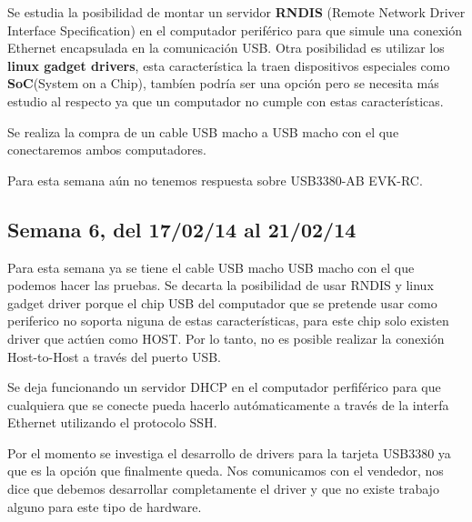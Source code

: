 \documentclass[11pt,oneside,titlepage]{article}
\begin{document}
Se estudia la posibilidad de montar un servidor \textbf{RNDIS} (Remote Network Driver Interface Specification) en el computador periférico para que simule una conexión Ethernet encapsulada en la comunicación USB. Otra posibilidad es utilizar los \textbf{linux gadget drivers}, esta característica la traen dispositivos especiales como \textbf{SoC}(System on a Chip), tambíen podría ser una opción pero se necesita más estudio al respecto ya que un computador no cumple con estas características.

Se realiza la compra de un cable USB macho a USB macho con el que conectaremos ambos computadores.

Para esta semana aún no tenemos respuesta sobre USB3380-AB EVK-RC.

\subsection*{Semana 6, del 17/02/14 al 21/02/14}
\begin{comment}
LUNES 
- Se adquirio el cable, se connecto pero no funciono. Se revisa si los
módulos estan compilados.  
- Estudiar la posibilidad de crear un driver.  
- Se manda correo a lista-usb. Espera de respuesta.
MARTES 
- No es posible conectar el cable usb entre PC. El hardware USB que
traen los PCI no es soportado por el driver linux gadget que es el encargado de
realizar esta conexión, 
- Hemos descartado la posibilidad de conectar PC to PC
con un cable simple.  Decidimos realizar la conexión a través de ethernet.
MIERCOLES 
- Invetsigación sobre otros métodos de conexión.
JUEVES 
- NNNNNNNNNNNNAAAAAAAAAAAADAAAAAAAaaaa 
VIERNES 
- NAAAAAAAAAAAAAAAADAAAAAAAAAAAa
\end{comment}

Para esta semana ya se tiene el cable USB macho USB macho con el que podemos hacer las pruebas. Se decarta la posibilidad de usar RNDIS y linux gadget driver porque el chip USB del computador que se pretende usar como periferico no soporta niguna de estas características, para este chip solo existen driver que actúen como HOST. Por lo tanto, no es posible realizar la conexión Host-to-Host a través del puerto USB. 

Se deja funcionando un servidor DHCP en el computador perfiférico para que cualquiera que se conecte pueda hacerlo autómaticamente a través de la interfa Ethernet utilizando el protocolo SSH.

Por el momento se investiga el desarrollo de drivers para la tarjeta USB3380 ya que es la opción que finalmente queda. Nos comunicamos con el vendedor, nos dice que debemos desarrollar completamente el driver y que no existe trabajo alguno para este tipo de hardware.
\end{document}
